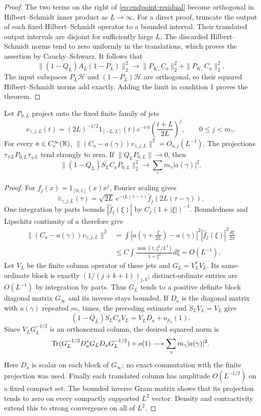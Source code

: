 \begin{proof}
The two terms on the right of \eqref{eq:endpoint-residual} become
orthogonal in Hilbert--Schmidt inner product as $L\to\infty$.
For a direct proof, truncate the output of each fixed
Hilbert--Schmidt operator to a bounded interval.  Their translated
output intervals are disjoint for sufficiently large $L$.
The discarded Hilbert--Schmidt norms tend to zero uniformly in the
translations, which proves the assertion by Cauchy--Schwarz.
It follows that
\[
 \|(1-Q_L)A_L(1-P_L)\|_2^2\longrightarrow
       \|P_{K_+}C_a\|_2^2+\|P_{K_-}C_a\|_2^2.
\]
The input subspaces $P_L\mathcal H$ and $(1-P_L)\mathcal H$ are
orthogonal, so their squared Hilbert--Schmidt norms add exactly.
Adding the limit in condition 1 proves the theorem.
\end{proof}

\begin{lemma}
\label{lem:critical-window-packet}
Let $P_{0,L}$ project onto the fixed finite family of jets
\[
 v_{\gamma,j,L}(t)=(2L)^{-1/2}1_{[-L,L]}(t)e^{-i\gamma t}
              \left(\frac{t+L}{2L}\right)^j,
       \qquad 0\leq j<m_\gamma.
\]
For every $a\in C_c^\infty(\mathbb R)$,
$\|(C_a-a(\gamma))v_{\gamma,j,L}\|^2=O_{a,j}(L^{-1})$.
The projections $\tau_{\mp L}P_{0,L}\tau_{\pm L}$ tend strongly
to zero. If $\|Q_LP_{0,L}\|\to0$, then
\[
 \|(1-Q_L)S_LC_aP_{0,L}\|_2^2
                    \longrightarrow\sum_\gamma m_\gamma|a(\gamma)|^2.
\]
\end{lemma}
\begin{proof}
For $f_j(x)=1_{[0,1]}(x)x^j$, Fourier scaling gives
\[
 \widehat v_{\gamma,j,L}(\tau)
 =\sqrt{2L}\,e^{-iL(\tau-\gamma)}
                         \widehat f_j(2L(\tau-\gamma)).
\]
One integration by parts bounds $|\widehat f_j(\xi)|$ by
$C_j(1+|\xi|)^{-1}$. Boundedness and Lipschitz continuity of $a$
therefore give
\begin{align*}
 \|(C_a-a(\gamma))v_{\gamma,j,L}\|^2
 &=\int\left|a\left(\gamma+\frac\xi{2L}\right)-a(\gamma)\right|^2
                  |\widehat f_j(\xi)|^2\frac{d\xi}{2\pi}\\
 &\leq C\int\frac{\min(1,\xi^2/L^2)}{1+\xi^2}d\xi
 =O(L^{-1}).
\end{align*}
Let $V_L$ be the finite column operator of these jets and
$G_L=V_L^*V_L$. Its same-ordinate block is exactly
$(1/(j+k+1))_{j,k}$; distinct-ordinate entries are $O(L^{-1})$
by integration by parts. Thus $G_L$ tends to a positive definite
block diagonal matrix $G_\infty$ and its inverse stays bounded.
If $D_a$ is the diagonal matrix with $a(\gamma)$ repeated
$m_\gamma$ times, the preceding estimate and $S_LV_L=V_L$ give
\[
 (1-Q_L)S_LC_aV_L=V_LD_a+o_{\mathcal S_2}(1).
\]
Since $V_LG_L^{-1/2}$ is an orthonormal column, the desired squared
norm is
\[
 \operatorname{Tr}(G_L^{-1/2}D_a^*G_LD_aG_L^{-1/2})+o(1)
             \longrightarrow\sum_\gamma m_\gamma|a(\gamma)|^2.
\]
Here $D_a$ is scalar on each block of $G_\infty$; no exact
commutation with the finite projection was used. Finally each
translated column has amplitude $O(L^{-1/2})$ on a fixed compact set.
The bounded inverse Gram matrix shows that its projection tends to
zero on every compactly supported $L^2$ vector. Density and
contractivity extend this to strong convergence on all of $L^2$.
\end{proof}

